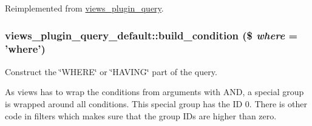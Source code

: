 Reimplemented from \hyperlink{classviews__plugin__query_afe5f004315f6e60d76f7365407a49e45}{views\_\-plugin\_\-query}.\hypertarget{classviews__plugin__query__default_aa135b39fb26099aaff9d4f6286a1ff66}{
\subsubsection[{build\_\-condition}]{\setlength{\rightskip}{0pt plus 5cm}views\_\-plugin\_\-query\_\-default::build\_\-condition (\$ {\em where} = {\ttfamily 'where'})}}
\label{classviews__plugin__query__default_aa135b39fb26099aaff9d4f6286a1ff66}
Construct the \char`\"{}WHERE\char`\"{} or \char`\"{}HAVING\char`\"{} part of the query.

As views has to wrap the conditions from arguments with AND, a special group is wrapped around all conditions. This special group has the ID 0. There is other code in filters which makes sure that the group IDs are higher than zero.


